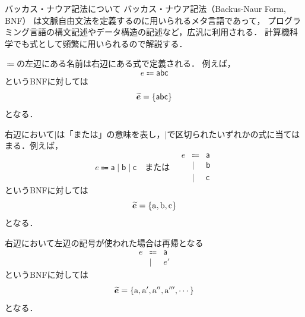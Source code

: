 \documentclass[a4paper,titlepage,report,disablejfam]{jsbook}
\begin{document}
\begin{resbonsiblesection}{バッカス・ナウア記法について}{\sakamoto}\label{sc:about-BNF-form}
バッカス・ナウア記法（Backus-Naur Form, BNF）
は文脈自由文法を定義するのに用いられるメタ言語であって，
プログラミング言語の構文記述やデータ構造の記述など，広汎に利用される．
計算機科学でも式として頻繁に用いられるので解説する．

$\Coloneqq$の左辺にある名前は右辺にある式で定義される．
例えば，
\begin{equation}\label{eq:bnf-example-1} 
e\Coloneqq \mathsf{abc}
\end{equation}
というBNFに対しては
\begin{equation}
\boldsymbol{\widetilde{e}} = \{\mathsf{abc}\}
\end{equation}
となる．

右辺において$\mid$は「または」の意味を表し，$\mid$で区切られたいずれかの式に当てはまる．例えば，
\begin{equation}\label{eq:bnf-example-2} 
e\Coloneqq \mathsf{a} \mid \mathsf{b} \mid \mathsf{c}
\quad\text{または}\quad
\begin{array}{rcl}
    e    &\Coloneqq& \mathsf{a} \\
            &\mid&   \mathsf{b} \\
            &\mid&   \mathsf{c} 
\end{array}
\end{equation}
というBNFに対しては
\begin{equation}
\boldsymbol{\widetilde{e}} = \{\mathrm{a}, \mathrm{b}, \mathrm{c}\}
\end{equation}
となる．

右辺において左辺の記号が使われた場合は再帰となる
\begin{equation}\label{eq:bnf-example-3} 
\begin{array}{rcl}
    e    &\Coloneqq& \mathsf{a} \\
            &\mid&   e\mathsf{'} 
\end{array}
\end{equation}
というBNFに対しては
\begin{equation}
\boldsymbol{\widetilde{e}} = \{\mathrm{a}, \mathrm{a'}, \mathrm{a''}, \mathrm{a'''}, \cdots \}
\end{equation}
となる．
\end{resbonsiblesection}
\end{document}
